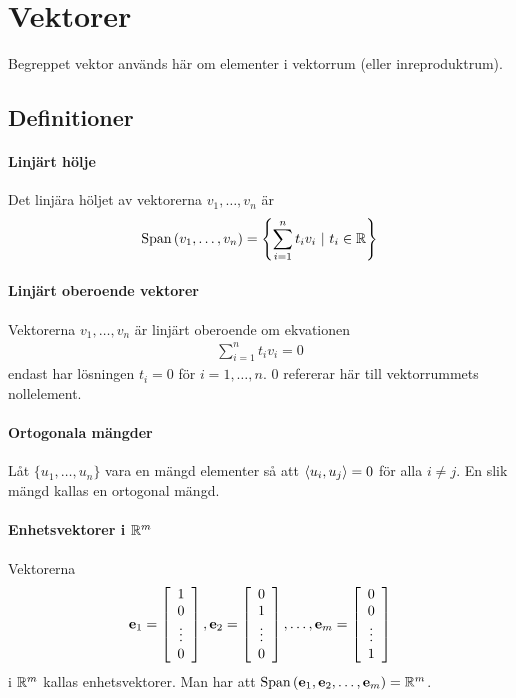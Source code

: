 \section{Vektorer}
Begreppet vektor används här om elementer i vektorrum (eller inreproduktrum).

\subsection{Definitioner}

\paragraph{Linjärt hölje}
Det linjära höljet av vektorerna $v_1, \dots, v_n$ är
\begin{align*}
	\Span{v_1, \dots, v_n} = \left\{\sum\limits_{i = 1}^{n} t_iv_i\ |\ t_i\in\R \right\}
\end{align*}

\paragraph{Linjärt oberoende vektorer}
Vektorerna $v_1, \dots, v_n$ är linjärt oberoende om ekvationen
\begin{align*}
	\sum\limits_{i = 1}^{n}t_iv_i = 0
\end{align*}
endast har lösningen $t_i = 0$ för $i = 1, \dots, n$. $0$ refererar här till vektorrummets nollelement.

\paragraph{Ortogonala mängder}
Låt $\{u_1, \dots, u_n\}$ vara en mängd elementer så att $\expval{u_i, u_j} = 0$ för alla $i\neq j$. En slik mängd kallas en ortogonal mängd.

\paragraph{Enhetsvektorer i $\mathbb{R}^m$}
Vektorerna
\begin{align*}
	\vect{e}_1 =
	\left[\begin{array}{c}
    	1    \\
    	0    \\
    	\vdots \\
	    0
	\end{array}\right],
	\vect{e}_2 =
	\left[\begin{array}{c}
    	0    \\
    	1    \\
    	\vdots \\
	    0
	\end{array}\right],
	\dots, \vect{e}_m =
	\left[\begin{array}{c}
    	0    \\
    	0    \\
    	\vdots \\
	    1
	\end{array}\right]
\end{align*}
i $\mathbb{R}^m$ kallas enhetsvektorer. Man har att $\Span{\vect{e}_1, \vect{e}_2, \dots, \vect{e}_m} = \R^{m}$.

